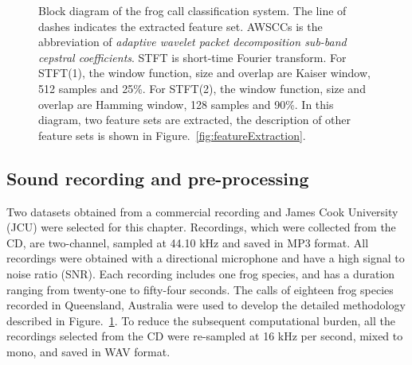 \begin{figure}[htb!] %
\caption[Block diagram of the frog call classification system for wavelet-based feature extraction]{Block diagram of the frog call classification system. The line of dashes indicates the extracted feature set. AWSCCs is the abbreviation of \textit{adaptive wavelet packet decomposition sub-band cepstral coefficients}. STFT is short-time Fourier transform. For STFT(1), the window function, size and overlap are Kaiser window, 512 samples and 25\%. For STFT(2), the window function, size and overlap are Hamming window, 128 samples and 90\%. In this diagram, two feature sets are extracted, the description of other feature sets is shown in Figure.~\ref{fig:featureExtraction}.}
\label{fig:Ch5_flowchart} 
\end{figure}


\subsection{Sound recording and pre-processing}

Two datasets obtained from a commercial recording \citep{CD} and James Cook University (JCU) were selected for this chapter. 
Recordings, which were collected from the CD, are two-channel, sampled at 44.10 kHz and saved in MP3 format. All recordings were obtained with a directional microphone and have a high signal to noise ratio (SNR). Each recording includes one frog species, and has a duration ranging from twenty-one to fifty-four seconds. The calls of eighteen frog species recorded in Queensland, Australia were used to develop the detailed methodology described in Figure.~\ref{fig:Ch5_flowchart}. To reduce the subsequent computational burden, all the recordings selected from the CD were re-sampled at 16 kHz per second, mixed to mono, and saved in WAV format. 

